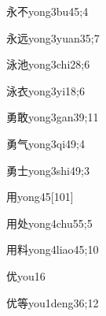 \begin{verbete}{永不}{yong3bu4}{5;4}
\end{verbete}

\begin{verbete}{永远}{yong3yuan3}{5;7}
\end{verbete}

\begin{verbete}{泳池}{yong3chi2}{8;6}
\end{verbete}

\begin{verbete}{泳衣}{yong3yi1}{8;6}
\end{verbete}

\begin{verbete}{勇敢}{yong3gan3}{9;11}
\end{verbete}

\begin{verbete}{勇气}{yong3qi4}{9;4}
\end{verbete}

\begin{verbete}{勇士}{yong3shi4}{9;3}
\end{verbete}

\begin{verbete}{用}{yong4}{5}[101]
\end{verbete}

\begin{verbete}{用处}{yong4chu5}{5;5}
\end{verbete}

\begin{verbete}{用料}{yong4liao4}{5;10}
\end{verbete}

\begin{verbete}{优}{you1}{6}
\end{verbete}

\begin{verbete}{优等}{you1deng3}{6;12}
\end{verbete}

